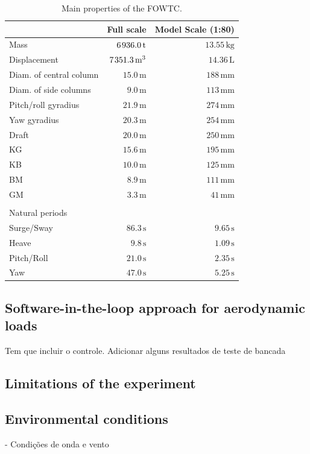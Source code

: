 \begin{table}[!hbtp]
	\centering
	\caption{Main properties of the FOWTC.} \label{tab:description_experiment:FOWTC_properties}   
	\begin{tabular}{lrr}
		\toprule
		& Full scale & Model Scale (1:80) \\
		\midrule
		Mass & $6 \mkern2mu 936.0 \, \text{t}$ & $13.55 \, \text{kg}$\\
		Displacement & $7 \mkern2mu 351.3 \, \text{m}^3$ & $14.36 \, \text{L}$\\
		Diam. of central column & $ 15.0 \, \text{m}$ & $188\,\text{mm}$ \\
		Diam. of side columns & $ 9.0 \, \text{m}$ & $113\,\text{mm}$ \\			
		Pitch/roll gyradius & $21.9 \, \text{m}$ & $274\,\text{mm}$ \\
		Yaw gyradius & $20.3 \, \text{m}$ & $254\,\text{mm}$\\
		Draft & $20.0 \, \text{m}$ & $250\,\text{mm}$ \\
		KG & $15.6 \, \text{m}$ & $195 \,\text{mm}$ \\
		KB & $10.0 \, \text{m}$ & $125 \,\text{mm}$  \\
		BM & $8.9 \, \text{m}$ & $111 \,\text{mm}$  \\
		GM & $3.3 \, \text{m}$ & $41 \,\text{mm}$  \\
        \bottomrule
        & & \\[-2pt]
        \multicolumn{3}{l}{Natural periods} \\ 
		\midrule        
		Surge/Sway & $86.3 \,\text{s}$ & $9.65 \,\text{s}$ \\
		Heave & $9.8 \,\text{s}$ & $1.09 \,\text{s}$ \\
		Pitch/Roll & $21.0 \,\text{s}$  & $2.35 \,\text{s}$\\
		Yaw & $47.0 \,\text{s}$ & $5.25 \,\text{s}$\\
		\bottomrule
	\end{tabular}%
\end{table}%




\subsection{Software-in-the-loop approach for aerodynamic loads}
Tem que incluir o controle. Adicionar alguns resultados de teste de bancada

\subsection{Limitations of the experiment}

\subsection{Environmental conditions} \label{sec:description_experiment:envir}
- Condições de onda e vento